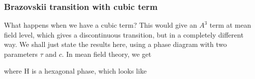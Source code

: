 \documentclass[a4paper]{article}
\begin{document}
\subsubsection*{Brazovskii transition with cubic term}
What happens when we have a cubic term? This would give an $A^3$ term at mean field level, which gives a discontinuous transition, but in a completely different way. We shall just state the results here, using a phase diagram with two parameters $\tau$ and $c$. In mean field theory, we get
\begin{center}
\end{center}
where H is a hexagonal phase, which looks like
\end{document}

